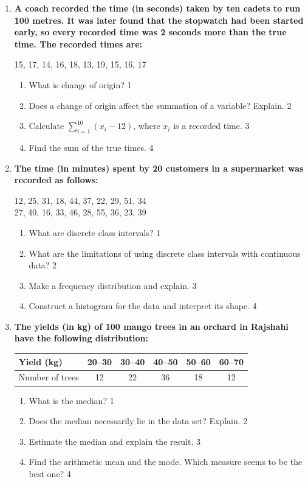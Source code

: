 \documentclass[12pt]{article}
\begin{document}
\begin{enumerate}

\item
\textbf{A coach recorded the time (in seconds) taken by ten cadets to run 100 metres. It was later found that the stopwatch had been started early, so every recorded time was 2 seconds more than the true time. The recorded times are:}
\begin{center}
15, 17, 14, 16, 18, 13, 19, 15, 16, 17
\end{center}
\begin{enumerate}
  \item What is change of origin? \hfill 1
  \item Does a change of origin affect the summation of a variable? Explain. \hfill 2
  \item Calculate $\displaystyle \sum_{i=1}^{10} (x_i-12)$, where $x_i$ is a recorded time. \hfill 3
  \item Find the sum of the true times. \hfill 4
\end{enumerate}

\item
\textbf{The time (in minutes) spent by 20 customers in a supermarket was recorded as follows:}
\begin{center}
12, 25, 31, 18, 44, 37, 22, 29, 51, 34 \\
27, 40, 16, 33, 46, 28, 55, 36, 23, 39
\end{center}
\begin{enumerate}
  \item What are discrete class intervals? \hfill 1
  \item What are the limitations of using discrete class intervals with continuous data? \hfill 2
  \item Make a frequency distribution and explain. \hfill 3
  \item Construct a histogram for the data and interpret its shape. \hfill 4
\end{enumerate}

\item
\textbf{The yields (in kg) of 100 mango trees in an orchard in Rajshahi have the following distribution:}
\begin{center}
\begin{tabular}{l|ccccc}
Yield (kg) & 20--30 & 30--40 & 40--50 & 50--60 & 60--70 \\ \hline
Number of trees & 12 & 22 & 36 & 18 & 12
\end{tabular}
\end{center}
\begin{enumerate}
  \item What is the median? \hfill 1
  \item Does the median necessarily lie in the data set? Explain. \hfill 2
  \item Estimate the median and explain the result. \hfill 3
  \item Find the arithmetic mean and the mode. Which measure seems to be the best one? \hfill 4
\end{enumerate}


\end{enumerate}
\end{document}
